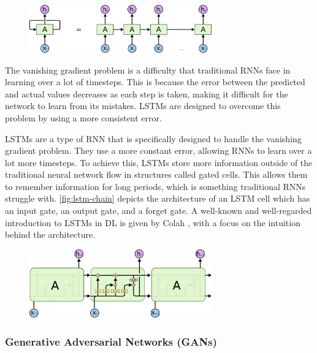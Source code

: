 \begin{figure}[h]
    \centering
    \captionsetup{format=hang} %
    \includegraphics[width=0.7\textwidth]{graphics/RNN-unrolled.png}
    \caption{\cite{Colah2015}}
    \label{fig:rnn-unrolled}
\end{figure}

The vanishing gradient problem is a difficulty that traditional \glspl{RNN} face in learning over a lot of timesteps. This is because the error between the predicted and actual values decreases as each step is taken, making it difficult for the network to learn from its mistakes. \Glspl{LSTM} are designed to overcome this problem by using a more consistent error.

\Glspl{LSTM} are a type of \gls{RNN} that is specifically designed to handle the vanishing gradient problem. They use a more constant error, allowing RNNs to learn over a lot more timesteps. To achieve this, LSTMs store more information outside of the traditional neural network flow in structures called gated cells. This allows them to remember information for long periods, which is something traditional \glspl{RNN} struggle with. \autoref{fig:lstm-chain} depicts the architecture of an \gls{LSTM} cell which has an input gate, an output gate, and a forget gate. A well-known and well-regarded introduction to \glspl{LSTM} in \gls{DL} is given by Colah \cite{Colah2015}, with a focus on the intuition behind the architecture.

\begin{figure}[h]
    \centering
    \includegraphics[width=0.7\textwidth]{graphics/LSTM3-chain.png}
    \caption{\cite{Colah2015}}
    \label{fig:lstm-chain}
\end{figure}


\subsubsection{Generative Adversarial Networks (GANs)\label{ssec:gan}}


